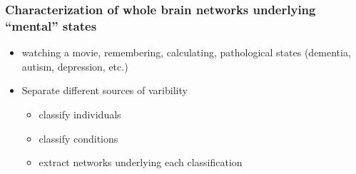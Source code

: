 \documentclass[final]{beamer}
\begin{document}
\begin{frame}
\transdissolve
\frametitle{Characterization of whole brain networks underlying ``mental'' states}
\begin{itemize}
\pause
	\item watching a movie, remembering, calculating, pathological states (dementia, autism, depression, etc.) 
\pause
	\item Separate different sources of varibility
\pause
	\begin{itemize}
		\item classify individuals
			\pause
		\item classify conditions 
			\pause
		\item extract networks underlying each classification
	\end{itemize}
\end{itemize}
\end{frame}
\end{document}
